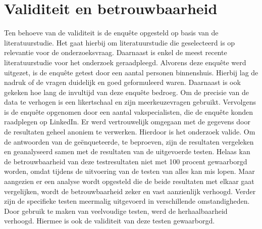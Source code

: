 \section{Validiteit en betrouwbaarheid}
Ten behoeve van de validiteit is de enquête opgesteld op basis van de literatuurstudie. Het gaat hierbij om literatuurstudie die geselecteerd is op relevantie voor de onderzoeksvraag. Daarnaast is enkel de meest recente literatuurstudie voor het onderzoek geraadpleegd.
\newline
\newline
Alvorens deze enquête werd uitgezet, is de enquête getest door een aantal personen binnenshuis. Hierbij lag de nadruk of de vragen duidelijk en goed geformuleerd waren. Daarnaast is ook gekeken hoe lang de invultijd van deze enquête bedroeg. Om de precisie van de data te verhogen is een likertschaal en zijn meerkeuzevragen gebruikt. Vervolgens is de enquête opgenomen door een aantal vakspecialisten, die de enquête konden raadplegen op LinkedIn. Er werd vertrouwelijk omgegaan met de gegevens door de resultaten geheel anoniem te verwerken. Hierdoor is het onderzoek valide.
\newline
\newline
Om de antwoorden van de geënqueteerde, te beproeven, zijn de resultaten vergeleken en geanalyseerd samen met de resultaten van de uitgevoerde testen. Helaas kan de betrouwbaarheid van deze testresultaten niet met 100 procent gewaarborgd worden, omdat tijdens de uitvoering van de testen van alles kan mis lopen. Maar aangezien er een analyse wordt opgesteld die de beide resultaten met elkaar gaat vergelijken, wordt de betrouwbaarheid zeker en vast aanzienlijk verhoogd.
\newline
\newline
Verder zijn de specifieke testen meermalig uitgevoerd in verschillende omstandigheden. Door gebruik te maken van veelvoudige testen, werd de herhaalbaarheid verhoogd. Hiermee is ook de validiteit van deze testen gewaarborgd.

